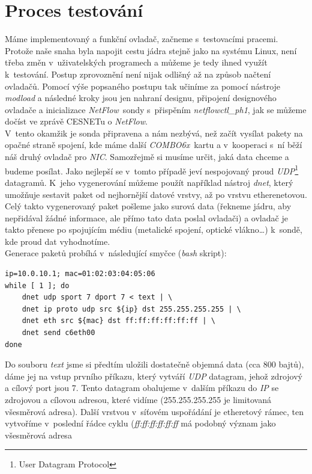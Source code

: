 \documentclass[final,11pt]{fithesis}
\newcommand{\comx}{\emph{COMBO6x}}
\newcommand{\nflow}{\emph{NetFlow}}
\newcommand{\nic}{\emph{NIC}}
\begin{document}
  \section{Proces testování}
  Máme implementovaný a funkční ovladač, začneme s~testovacími pracemi.
  Protože naše snaha byla napojit cestu jádra stejně jako na systému Linux,
  není třeba změn v~uživatelských programech a můžeme je tedy ihned využít
  k~testování. Postup
  zprovoznění není nijak odlišný až na způsob načtení ovladačů. Pomocí výše
  popsaného postupu tak učiníme za pomocí nástroje \emph{modload} a následné
  kroky jsou jen nahraní designu, připojení designového ovladače a
  inicializace \nflow\ sondy s~přispěním \emph{netflowctl\_ph1}, jak se můžeme
  dočíst ve zprávě CESNETu\cite{nflow} o \nflow. \\ \indent
  V~tento okamžik je sonda připravena a nám nezbývá, než začít vysílat pakety
  na opačné straně spojení, kde máme další \comx\ kartu a v~kooperaci
  s~ní běží náš druhý ovladač pro \nic. Samozřejmě si musíme určit, jaká data
  chceme a budeme posílat. Jako nejlepší se v~tomto případě jeví nespojovaný
  proud \emph{UDP}\footnote{User Datagram Protocol} datagramů. K~jeho
  vygenerování můžeme použít například nástroj \emph{dnet}, který umožňuje
  sestavit paket od nejhornější datové vrstvy, až po vrstvu etherenetovou.
  Celý takto vygenerovaný paket pošleme jako surová data (řekneme jádru, aby
  nepřidával žádné informace, ale přímo tato data poslal ovladači) a ovladač
  je takto přenese po spojujícím médiu (metalické spojení, optické
  vlákno\ldots) k~sondě, kde proud dat vyhodnotíme. \\ \indent
  Generace paketů probíhá v~následující smyčce (\emph{bash} skript):
\begin{verbatim}
ip=10.0.10.1; mac=01:02:03:04:05:06
while [ 1 ]; do
    dnet udp sport 7 dport 7 < text | \
    dnet ip proto udp src ${ip} dst 255.255.255.255 | \
    dnet eth src ${mac} dst ff:ff:ff:ff:ff:ff | \
    dnet send c6eth00
done
\end{verbatim}
  Do souboru \emph{text} jsme si předtím uložili dostatečně objemná data (cca
  800 bajtů), dáme jej na vstup prvního příkazu, který vytváří \emph{UDP}
  datagram, jehož zdrojový a cílový port jsou 7. Tento datagram obalujeme
  v~dalším příkazu do \emph{IP} se zdrojovou a cílovou adresou, které vidíme
  (255.255.255.255 je limitovaná všesměrová adresa). Další vrstvou v~síťovém
  uspořádání je etheretový rámec, ten vytvoříme v~poslední řádce cyklu
  (\emph{ff:ff:ff:ff:ff:ff} má podobný význam jako všesměrová adresa
\end{document}
